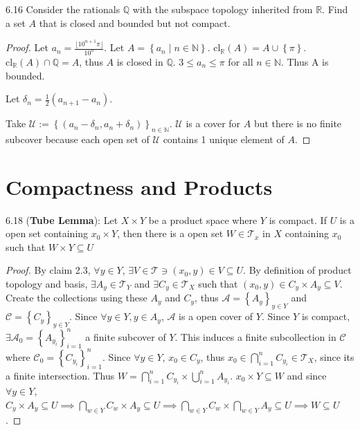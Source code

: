 \documentclass{article}
\newcommand*{\T}{\mathcal{T}}
\newcommand*{\cl}{\mathrm{cl}}
\newcommand{\R}{\mathbb{R}}
\newcommand{\Q}{\mathbb{Q}}
\newcommand{\N}{\mathbb{N}}
\newcommand{\floor}[1]{\lfloor{#1}\rfloor}
\begin{document}
\bigskip

\begin{PROB}{6.16}\label{Problem 6.16.}
    Consider the rationals $\Q$ with the subspace topology inherited from $\R$. Find a set $A$ that is closed and bounded but not compact.   
\end{PROB}
\begin{proof}
    Let $a_n = \frac{\floor{10^{n + 1}\pi}}{10^n}$. Let $A = \left\{ a_n \mid n \in \N \right\}$. $\cl_\R(A) = A \cup \left\{ \pi \right\}$. $\cl_{\R}(A) \cap \Q = A$, thus $A$ is closed in $\Q$. $3 \leq a_n \leq \pi$ for all $n \in \N$. Thus A is bounded. 

    Let $\delta_n = \frac{1}{2}\left(a_{n + 1} - a_n\right)$.  
    
    Take $\mathcal{U} := \left\{ (a_n - \delta_n, a_n + \delta_n) \right\}_{n \in \N}$. $
    \mathcal{U}$ is a cover for $A$ but there is no finite subcover because each open set of $\mathcal{U}$ contains 1 unique element of $A$.      
\end{proof}

\pagebreak

\section{Compactness and Products}
\begin{claim}{6.18}\label{Claim 6.18.}
    (\textbf{Tube Lemma}): Let $X \times Y$ be a product space where $Y$ is compact. If $U$ is a open set containing $x_0 \times Y$, then there is a open set $W \in \T_x$ in $X$ containing $x_0$ such that $W \times Y \subseteq U$        
\end{claim}
\begin{proof}
    By claim 2.3, $\forall y \in Y$, $\exists V \in \T \ni (x_0, y) \in V \subseteq U$. By definition of product topology and basis, $\exists A_{y} \in \T_Y$ and $\exists C_{y} \in \T_X$ such that $(x_0, y) \in C_y \times A_y \subseteq V$. Create the collections using these $A_y$ and $C_y$, thus $\mathcal{A} = \left\{ A_y \right\}_{y \in Y}$ and $\mathcal{C} = \left\{ C_y \right\}_{y \in Y}$. Since $\forall y \in Y, y \in A_y$, $\mathcal{A}$ is a open cover of $Y$. Since $Y$ is compact, $\exists \mathcal{A_0} = \left\{ A_{y_i} \right\}_{i = 1}^n$ a finite subcover of $Y$. This induces a finite subcollection in $\mathcal{C}$ where $\mathcal{C}_0 = \left\{ C_{y_i} \right\}_{i = 1}^n$. Since $\forall y \in Y$, $x_0 \in C_{y}$, thus $x_0 \in \bigcap_{i = 1}^n C_{y_i} \in \T_X$, since its a finite intersection. Thus $W = \bigcap_{i = 1}^n C_{y_i} \times \bigcup_{i = 1}^n A_{y_i}$. $x_0 \times Y \subseteq W$ and since $\forall y \in Y$, $C_y \times A_y \subseteq U \implies \bigcap_{w \in Y} C_w \times A_y \subseteq U \implies \bigcap_{w \in Y} C_w \times \bigcap_{w \in Y} A_y \subseteq U \implies W \subseteq U$.                        
\end{proof}
\end{document}
